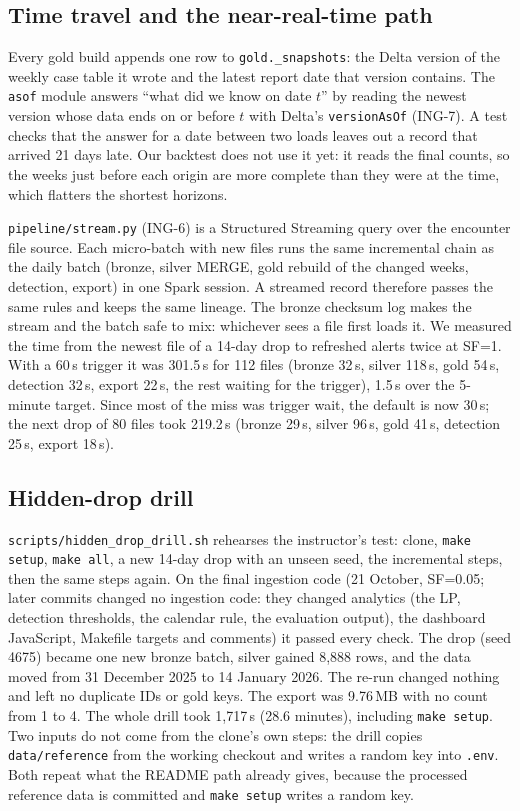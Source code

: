 \subsection{Time travel and the near-real-time path}\label{sec:stream}
Every gold build appends one row to \texttt{gold.\_snapshots}: the Delta version of the weekly case table it
wrote and the latest report date that version contains. The \texttt{asof} module answers ``what did we
know on date $t$'' by reading the newest version whose data ends on or before $t$ with Delta's
\texttt{versionAsOf} (ING-7). A test checks that the answer for a date between two loads leaves out a record
that arrived 21 days late. Our backtest does not use it yet: it reads the final counts, so the weeks just
before each origin are more complete than they were at the time, which flatters the shortest horizons.

\texttt{pipeline/stream.py} (ING-6) is a Structured Streaming query over the encounter file source. Each
micro-batch with new files runs the same incremental chain as the daily batch (bronze, silver MERGE, gold
rebuild of the changed weeks, detection, export) in one Spark session. A streamed record therefore passes the same
rules and keeps the same lineage. The bronze checksum log makes the stream and the batch safe to mix: whichever
sees a file first loads it. We measured the time from the newest file of a 14-day drop to refreshed alerts
twice at SF=1. With a 60\,s trigger it was 301.5\,s for 112 files (bronze 32\,s, silver 118\,s, gold 54\,s,
detection 32\,s, export 22\,s, the rest waiting for the trigger), 1.5\,s over the 5-minute target. Since most
of the miss was trigger wait, the default is now 30\,s; the next drop of 80 files took 219.2\,s (bronze 29\,s,
silver 96\,s, gold 41\,s, detection 25\,s, export 18\,s).

\subsection{Hidden-drop drill}
\texttt{scripts/hidden\_drop\_drill.sh} rehearses the instructor's test: clone, \texttt{make setup},
\texttt{make all}, a new 14-day drop with an unseen seed, the incremental steps, then the same steps again. On
the final ingestion code (21 October, SF=0.05; later commits changed no ingestion code: they changed analytics (the LP, detection thresholds, the calendar rule, the evaluation output), the dashboard JavaScript, Makefile targets and comments) it passed every check. The drop (seed 4675) became one new bronze batch,
silver gained 8,888 rows, and the data moved from 31 December 2025 to 14 January 2026. The re-run changed
nothing and left no duplicate IDs or gold keys. The export was 9.76\,MB with no count from 1 to 4. The whole
drill took 1,717\,s (28.6 minutes), including \texttt{make setup}. Two inputs do not come from the clone's
own steps: the drill copies \nolinkurl{data/reference} from the working checkout and writes a random key into
\texttt{.env}. Both repeat what the README path already gives, because the processed reference data is
committed and \texttt{make setup} writes a random key.
